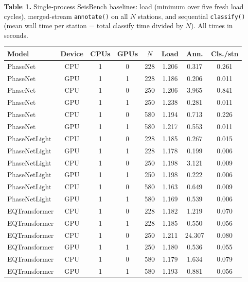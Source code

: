 \clearpage
\begin{landscape}

\begin{center}
\textbf{Table 1.} Single-process SeisBench baselines: load (minimum over five fresh load cycles), merged-stream \texttt{annotate()} on all \(N\) stations, and sequential \texttt{classify()} (mean wall time per station = total classify time divided by \(N\)). All times in seconds.

\vspace{0.8em}
\small
\begin{tabular}{lccccccc}
\toprule
\textbf{Model} & \textbf{Device} & \textbf{CPUs} & \textbf{GPUs} & \textbf{\(N\)} & \textbf{Load} & \textbf{Ann.} & \textbf{Cls./stn} \\
\midrule
PhaseNet       & CPU & 1 & 0 & 228 & 1.206 & 0.317 & 0.261 \\
PhaseNet       & GPU & 1 & 1 & 228 & 1.186 & 0.206 & 0.011 \\
PhaseNet       & CPU & 1 & 0 & 250 & 1.206 & 3.965 & 0.841 \\
PhaseNet       & GPU & 1 & 1 & 250 & 1.238 & 0.281 & 0.011 \\
PhaseNet       & CPU & 1 & 0 & 580 & 1.194 & 0.713 & 0.226 \\
PhaseNet       & GPU & 1 & 1 & 580 & 1.217 & 0.553 & 0.011 \\
PhaseNetLight  & CPU & 1 & 0 & 228 & 1.185 & 0.267 & 0.015 \\
PhaseNetLight  & GPU & 1 & 1 & 228 & 1.178 & 0.199 & 0.006 \\
PhaseNetLight  & CPU & 1 & 0 & 250 & 1.198 & 3.121 & 0.009 \\
PhaseNetLight  & GPU & 1 & 1 & 250 & 1.198 & 0.222 & 0.006 \\
PhaseNetLight  & CPU & 1 & 0 & 580 & 1.163 & 0.649 & 0.009 \\
PhaseNetLight  & GPU & 1 & 1 & 580 & 1.169 & 0.539 & 0.006 \\
EQTransformer  & CPU & 1 & 0 & 228 & 1.182 & 1.219 & 0.070 \\
EQTransformer  & GPU & 1 & 1 & 228 & 1.185 & 0.550 & 0.056 \\
EQTransformer  & CPU & 1 & 0 & 250 & 1.211 & 24.307 & 0.080 \\
EQTransformer  & GPU & 1 & 1 & 250 & 1.180 & 0.536 & 0.055 \\
EQTransformer  & CPU & 1 & 0 & 580 & 1.179 & 1.634 & 0.079 \\
EQTransformer  & GPU & 1 & 1 & 580 & 1.193 & 0.881 & 0.056 \\

\end{tabular}
\end{center}
\end{landscape}
